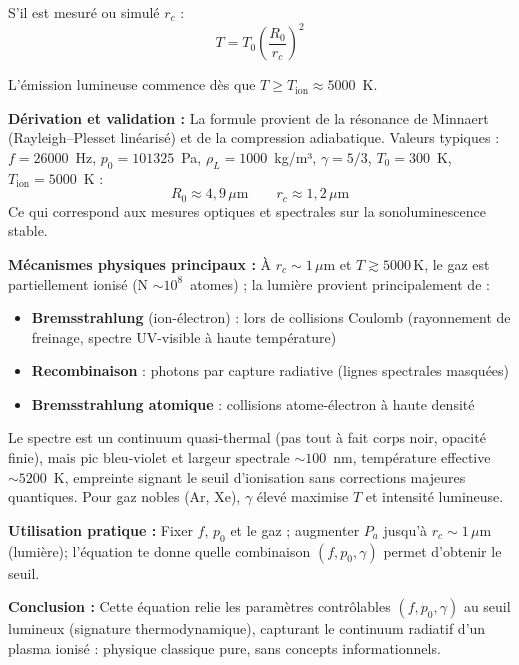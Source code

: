 \documentclass[a4paper,12pt]{article}
\begin{document}
S'il est mesuré ou simulé $r_c$ :
\begin{equation}
T = T_0 \left( \frac{R_0}{r_c} \right)^2
\end{equation}

L'émission lumineuse commence dès que $T \geq T_\text{ion} \approx 5000$~K.

\bigskip

\textbf{Dérivation et validation :}
La formule provient de la résonance de Minnaert (Rayleigh–Plesset linéarisé) et de la compression adiabatique. Valeurs typiques : $f = 26000$~Hz, $p_0 = 101325$~Pa, $\rho_L = 1000$~kg/m³, $\gamma = 5/3$, $T_0 = 300$~K, $T_\text{ion} = 5000$~K :
\[
R_0 \approx 4{,}9\,\mu\text{m} \qquad r_c \approx 1{,}2\,\mu\text{m}
\]
Ce qui correspond aux mesures optiques et spectrales sur la sonoluminescence stable.

\bigskip

\textbf{Mécanismes physiques principaux :}
À $r_c \sim 1\,\mu\text{m}$ et $T \gtrsim 5000\,\text{K}$, le gaz est partiellement ionisé (N $\sim 10^8$~atomes) ; la lumière provient principalement de :
\begin{itemize}
    \item \textbf{Bremsstrahlung} (ion-électron) : lors de collisions Coulomb (rayonnement de freinage, spectre UV-visible à haute température)
    \item \textbf{Recombinaison} : photons par capture radiative (lignes spectrales masquées)
    \item \textbf{Bremsstrahlung atomique} : collisions atome-électron à haute densité
\end{itemize}

Le spectre est un continuum quasi-thermal (pas tout à fait corps noir, opacité finie), mais pic bleu-violet et largeur spectrale $\sim 100$~nm, température effective $\sim 5200$~K, empreinte signant le seuil d'ionisation sans corrections majeures quantiques. Pour gaz nobles (Ar, Xe), $\gamma$ élevé maximise $T$ et intensité lumineuse.

\bigskip

\textbf{Utilisation pratique :}
Fixer $f$, $p_0$ et le gaz ; augmenter $P_a$ jusqu'à $r_c \sim 1\,\mu\text{m}$ (lumière); l'équation te donne quelle combinaison $(f, p_0, \gamma)$ permet d'obtenir le seuil.

\bigskip

\textbf{Conclusion :}
Cette équation relie les paramètres contrôlables $(f, p_0, \gamma)$ au seuil lumineux (signature thermodynamique), capturant le continuum radiatif d'un plasma ionisé : physique classique pure, sans concepts informationnels.
\end{document}
